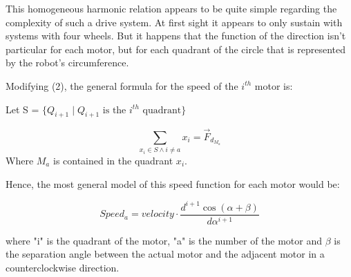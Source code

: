 \documentclass{article}
\begin{document}
\begin{multicols}{2}
This homogeneous harmonic relation appears to be quite simple regarding the complexity of such a drive system. At first sight it appears to only sustain with systems with four wheels. But it happens that the function of the direction isn't particular for each motor, but for each quadrant of the circle that is represented by the robot's circumference.
\bigskip

Modifying (2), the general formula for the speed of the $i^{th}$ motor is: 

\begin{center}
Let S = $\{Q_{i+1} \mid Q_{i+1} \text{ is the }  i^{th} \text{ quadrant} \}$
\end{center}

\begin{equation}
\sum_{ x_i \in S \wedge i\neq a} x_i = \overrightarrow{F}_{d_{M_{a}}}
\end{equation}
Where $M_{a}$ is contained in the quadrant $x_{i}$.\\
\begin{justify}
Hence, the most general model of this speed function for each motor would be: 
\end{justify}


\bigskip
\begin{equation}
Speed_{a} = velocity \cdot \frac{d^{i+1}\cos(\alpha+ \beta)}{d\alpha^{i+1}}
\end{equation}
\bigskip

where "i" is the quadrant of the motor, "a" is the number of the motor and $\beta$ is the separation angle between the actual motor and the adjacent motor in a counterclockwise direction.

\bigskip
\bigskip
\end{multicols}
\end{document}
